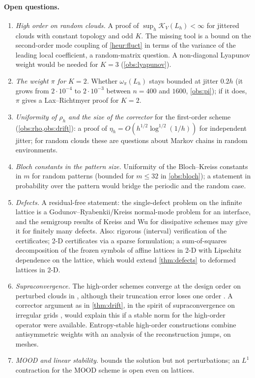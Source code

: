 \documentclass[11pt,a4paper]{article}
\theoremstyle{plain}
\theoremstyle{definition}
\theoremstyle{remark}
\numberwithin{equation}{section}
\newcommand{\A}[1]{\cite[#1]{Addendum}}
\begin{document}
\paragraph{Open questions.}
\begin{enumerate}[label=(\alph*)]
\item \emph{High order on random clouds.} A proof of $\sup_h\mathcal K_V(L_h)<\infty$ for jittered clouds with constant topology and odd $K$. The missing tool is a bound on the second-order mode coupling of \cref{heur:fluct} in terms of the variance of the leading local coefficient, a random-matrix question. A non-diagonal Lyapunov weight would be needed for $K=3$ (\cref{obs:lyapunov}).
\item \emph{The weight $\pi$ for $K=2$.} Whether $\omega_\pi(L_h)$ stays bounded at jitter $0.2h$ (it grows from $2\cdot10^{-4}$ to $2\cdot10^{-3}$ between $n=400$ and $1600$, \cref{obs:pi}); if it does, $\pi$ gives a Lax--Richtmyer proof for $K=2$.
\item \emph{Uniformity of $\rho_h$ and the size of the corrector} for the first-order scheme (\cref{obs:rho,obs:drift}): a proof of $\eta_h=O(h^{1/2}\log^{1/2}(1/h))$ for independent jitter; for random clouds these are questions about Markov chains in random environments.
\item \emph{Bloch constants in the pattern size.} Uniformity of the Bloch--Kreiss constants in $m$ for random patterns (bounded for $m\le32$ in \cref{obs:bloch}); a statement in probability over the pattern would bridge the periodic and the random case.
\item \emph{Defects.} A residual-free statement: the single-defect problem on the infinite lattice is a Godunov--Ryabenkii/Kreiss normal-mode problem for an interface, and the semigroup results of Kreiss and Wu \cite{KreissWu1993} for dissipative schemes may give it for finitely many defects. Also: rigorous (interval) verification of the certificates; 2-D certificates via a sparse formulation; a sum-of-squares decomposition of the frozen symbols of affine lattices in 2-D with Lipschitz dependence on the lattice, which would extend \cref{thm:defects} to deformed lattices in 2-D.
\item \emph{Supraconvergence.} The high-order schemes converge at the design order on perturbed clouds in \cite{JungMUSCL2026}, although their truncation error loses one order \A{Prop.~4.3}. A corrector argument as in \cref{thm:drift}, in the spirit of supraconvergence on irregular grids \cite{KreissEtAl1986}, would explain this if a stable norm for the high-order operator were available. Entropy-stable high-order constructions \cite{Tadmor2003,FjordholmMishraTadmor2012} combine antisymmetric weights with an analysis of the reconstruction jumps, on meshes.
\item \emph{MOOD and linear stability.}  bounds the solution but not perturbations; an $L^1$ contraction for the MOOD scheme is open even on lattices.
\end{enumerate}
\end{document}
